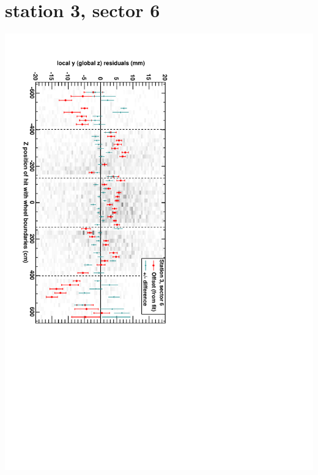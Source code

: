 \documentclass[compress]{beamer}
\begin{document}
\section*{station 3, sector 6}
\begin{frame} \vfill \mbox{\hspace{-1 cm}\includegraphics[height=1.2\linewidth, angle=90]{DTzVsZ_st3_sr06.pdf}} \end{frame}
\end{document}
